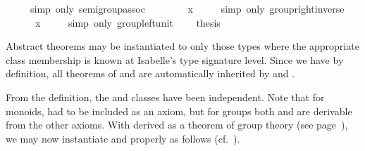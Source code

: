 \begin{isabellebody}
\ \ \ \ \ {\isacharparenleft}simp\ only{\isacharcolon}\ semigroup{\isachardot}assoc{\isacharparenright}\isanewline
\ \ \ \ {\isachardoublequote}{\isachardot}{\isachardot}{\isachardot}\ {\isacharequal}\ {\isasymunit}\ {\isasymodot}\ x{\isachardoublequote}\isanewline
\ \ \ \ \ {\isacharparenleft}simp\ only{\isacharcolon}\ group{\isacharunderscore}right{\isacharunderscore}inverse{\isacharparenright}\isanewline
\ \ \ \ {\isachardoublequote}{\isachardot}{\isachardot}{\isachardot}\ {\isacharequal}\ x{\isachardoublequote}\isanewline
\ \ \ \ \ {\isacharparenleft}simp\ only{\isacharcolon}\ group{\isachardot}left{\isacharunderscore}unit{\isacharparenright}\isanewline
\ \ \ \ {\isacharquery}thesis\ \isacommand{{\isachardot}}\isanewline
{}%
\begin{isamarkuptext}%
\medskip Abstract theorems may be instantiated to only those types
 \isa{{\isasymtau}} where the appropriate class membership  is
 known at Isabelle's type signature level.  Since we have  by definition, all theorems of  and  are automatically inherited by  and .%
\end{isamarkuptext}%
%
%
\begin{isamarkuptext}%
From the definition, the  and  classes
 have been independent.  Note that for monoids,  had
 to be included as an axiom, but for groups both 
 and  are derivable from the other axioms.  With
  derived as a theorem of group theory (see
 page~\pageref{thm:group-right-unit}), we may now instantiate  and  properly as
 follows (cf.\ ).


\end{isamarkuptext}
\end{isabellebody}
